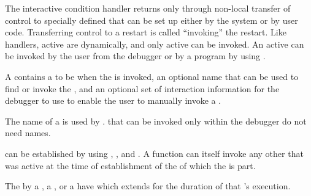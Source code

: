The interactive condition handler returns only through
non-local transfer of control to specially defined 
that can be set up either by the system or by user code.  Transferring
control to a restart is called ``invoking'' the restart.  Like
handlers, active  are 
dynamically, and 
only active 
can be invoked.  An active 
 can be invoked by the user from
the debugger or by a program by using .
 
A  contains a 
 to be  when the  is
invoked, an optional name that can be used to find or invoke the 
, and
an optional set of interaction information for the debugger to use to
enable the user to manually invoke a . 

The name of a  is
used by .  that can be invoked
only within the debugger do not need names.
 
 can be established by using , 
, and .
A  function can itself invoke any other 
that was active at the time of establishment of the  
of which the  is part.

The   by 
    a  , 
    a  ,
 or a  
have 
which extends for the duration of that 's execution.

